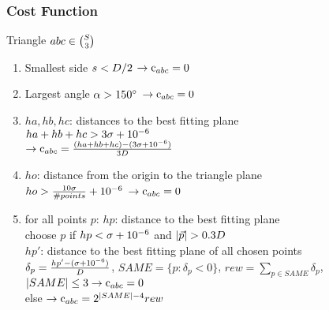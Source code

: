 \begin{frame}
    \frametitle{Cost Function}
    Triangle $abc \in \binom{S}{3}$
    \begin{enumerate}
        \item Smallest side $s < D/2$
        $\to \operatorname{c}_{abc} = 0$
        \item Largest angle $\alpha > 150\degree$
        $\to \operatorname{c}_{abc} = 0$
        \item $ha,hb,hc$: distances to the best fitting plane\\
        $ha + hb + hc > 3\sigma + 10^{-6}$\\
        $\to \operatorname{c}_{abc} = \frac{(ha + hb + hc) - (3\sigma + 10^{-6})}{3D}$
        \item $ho$: distance from the origin to the triangle plane\\
        $ho > \frac{10\sigma}{\#points} + 10^{-6}$
        $\to \operatorname{c}_{abc} = 0$
        \item for all points $p$:
        $hp$: distance to the best fitting plane\\
        choose $p$ if $hp < \sigma + 10^{-6}$ and $|\vec{p}| > 0.3D$\\
        $hp'$: distance to the best fitting plane of all chosen points\\ 
        $\delta_p = \frac{hp' - (\sigma + 10^{-6})}{D}$,
        $SAME = \{p \colon \delta_p < 0\}$,
        $rew = \sum\limits_{p \in SAME} \delta_p$,\\
        $|SAME| \leq 3 \to \operatorname{c}_{abc} = 0$\\
        else $\to \operatorname{c}_{abc} = 2^{|SAME|-4}rew$
    \end{enumerate}
\end{frame}
